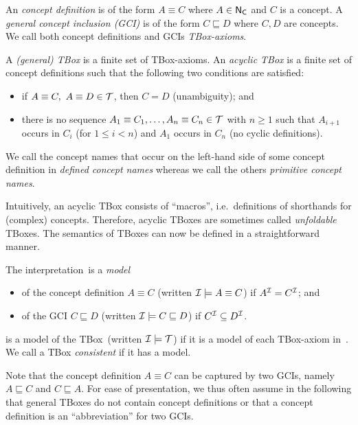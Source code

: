 \begin{definition}\label{def:syntax-tbox}
    An \emph{concept definition} is of the form $A\equiv C$ where $A\in\mathsf{N_C}$ and
    $C$ is a concept.
    A \emph{general concept inclusion (GCI)} is of the form $C\sqsubseteq D$
    where $C,D$ are concepts.
    We call both concept definitions and GCIs \emph{TBox-axioms}.

    A \emph{(general) TBox} is a finite set of TBox-axioms.
    An \emph{acyclic TBox} \Tmc is a finite set of concept definitions such that
    the following two conditions are satisfied:
    \begin{itemize}
        \item if $A\equiv C,\ A\equiv D\in\mathcal{T}$, then $C=D$ (unambiguity); and
        \item there is no sequence $A_1\equiv C_1,\dots,A_n\equiv C_n\in\mathcal{T}$
            with $n\ge 1$ such that $A_{i+1}$ occurs in $C_i$ (for $1\le i<n$)
            and $A_1$ occurs in $C_n$ (no cyclic definitions).
    \end{itemize}
    We call the concept names that occur on the left-hand side of some concept
    definition in \Tmc \emph{defined concept names} whereas we call the others
    \emph{primitive concept names}.
\end{definition}

\noindent
Intuitively, an acyclic TBox consists of \enquote{macros}, i.e.\ definitions of
shorthands for (complex) concepts.  Therefore, acyclic TBoxes are sometimes
called \emph{unfoldable} TBoxes.
%
The semantics of TBoxes can now be defined in a straightforward manner.

\begin{definition}\label{def:semantics-tbox}
    The interpretation~\Imc is a \emph{model}
    \begin{itemize}
        \item of the concept definition $A\equiv C$ (written $\mathcal{I}\models
            A\equiv C$) if $A^\mathcal{I}=C^\mathcal{I}$; and
        \item of the GCI $C\sqsubseteq D$ (written $\mathcal{I}\models C\sqsubseteq D$)
            if $C^\mathcal{I}\subseteq D^\mathcal{I}$.
    \end{itemize}
    \Imc is a model of the TBox~\Tmc (written $\mathcal{I}\models\mathcal{T}$) if it is a
    model of each TBox-axiom in~\Tmc.
    We call a TBox \emph{consistent} if it has a model.
\end{definition}

\noindent
Note that the concept definition $A\equiv C$ can be captured by two GCIs, namely
$A\sqsubseteq C$ and $C\sqsubseteq A$.  For ease of presentation, we thus often
assume in the following that general TBoxes do not contain concept definitions
or that a concept definition is an \enquote{abbreviation} for two GCIs.

